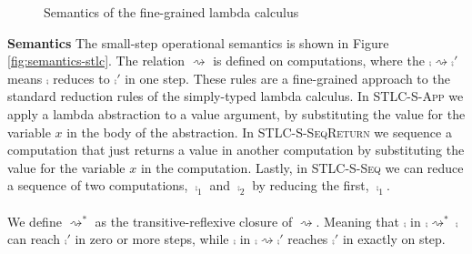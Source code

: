 {%

\begin{figure}
\caption{Semantics of the fine-grained lambda calculus}
\centering
{}
\end{figure}

\textbf{Semantics}
The small-step operational semantics is shown in Figure \ref{fig:semantics-stlc}.
The relation $\rightsquigarrow$ is defined on computations, where the $\comp \rightsquigarrow \comp'$ means $\comp$ reduces to $\comp'$ in one step.
These rules are a fine-grained approach to the standard reduction rules of the simply-typed lambda calculus.
In {\footnotesize\textsc{STLC-S-App}} we apply a lambda abstraction to a value argument, by substituting the value for the variable $x$ in the body of the abstraction.
In {\footnotesize\textsc{STLC-S-SeqReturn}} we sequence a computation that just returns a value in another computation by substituting the value for the variable $x$ in the computation.
Lastly, in {\footnotesize\textsc{STLC-S-Seq}} we can reduce a sequence of two computations, $\comp_1$ and $\comp_2$ by reducing the first, $\comp_1$.
\\\\
We define $\rightsquigarrow^*$ as the transitive-reflexive closure of $\rightsquigarrow$.
Meaning that $\comp$ in $\comp \rightsquigarrow^* \comp$ can reach $\comp'$ in zero or more steps, while $\comp$ in $\comp \rightsquigarrow \comp'$ reaches $\comp'$ in exactly on step.


}
